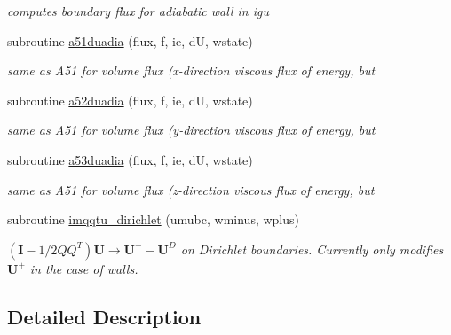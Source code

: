 \begin{DoxyCompactItemize}
\begin{DoxyCompactList}\small\item\em computes boundary flux for adiabatic wall in igu \end{DoxyCompactList}\item 
subroutine \hyperlink{group__bcond_ga224b6cf6476419f057df67c7a0d05504}{a51duadia} (flux, f, ie, d\-U, wstate)
\begin{DoxyCompactList}\small\item\em same as A51 for volume flux (x-\/direction viscous flux of energy, but \end{DoxyCompactList}\item 
subroutine \hyperlink{group__bcond_gaaaddd14c010da1bce6192846a45b63f2}{a52duadia} (flux, f, ie, d\-U, wstate)
\begin{DoxyCompactList}\small\item\em same as A51 for volume flux (y-\/direction viscous flux of energy, but \end{DoxyCompactList}\item 
subroutine \hyperlink{group__bcond_ga4311cb4d64847bc8b17c653ca9185866}{a53duadia} (flux, f, ie, d\-U, wstate)
\begin{DoxyCompactList}\small\item\em same as A51 for volume flux (z-\/direction viscous flux of energy, but \end{DoxyCompactList}\item 
subroutine \hyperlink{group__bcond_ga01708cdee955465babb7a371d4e5effa}{imqqtu\-\_\-dirichlet} (umubc, wminus, wplus)
\begin{DoxyCompactList}\small\item\em $\left(\mathbf{I}-1/2QQ^T\right)\mathbf{U}\rightarrow\mathbf{U}^--\mathbf{U}^D$ on Dirichlet boundaries. Currently only modifies $\mathbf{U}^+$ in the case of walls. \end{DoxyCompactList}\end{DoxyCompactItemize}


\subsection{Detailed Description}


